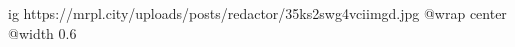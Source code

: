  
 
 
 
 

\ifcmt
  ig https://mrpl.city/uploads/posts/redactor/35ks2swg4vciimgd.jpg
  @wrap center
  @width 0.6
\fi
